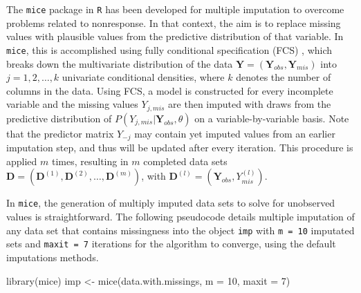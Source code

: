 \documentclass[psych,article,submit,moreauthors,pdftex]{mdpi}
\newenvironment{Shaded}{\begin{snugshade}}{\end{snugshade}}
\newcommand{\AttributeTok}[1]{\textcolor[rgb]{0.77,0.63,0.00}{#1}}
\newcommand{\DecValTok}[1]{\textcolor[rgb]{0.00,0.00,0.81}{#1}}
\newcommand{\FunctionTok}[1]{\textcolor[rgb]{0.00,0.00,0.00}{#1}}
\newcommand{\NormalTok}[1]{#1}
\newcommand{\OtherTok}[1]{\textcolor[rgb]{0.56,0.35,0.01}{#1}}
\begin{document}
The \texttt{mice} package \citep{mice} in \texttt{R} \citep{Rproject}
has been developed for multiple imputation to overcome problems related
to nonresponse. In that context, the aim is to replace missing values
with plausible values from the predictive distribution of that variable.
In \texttt{mice}, this is accomplished using fully conditional
specification (FCS) \citep{vanbuuren_fully_2006}, which breaks down the
multivariate distribution of the data
\(\textbf{Y} = (\textbf{Y}_{obs}, \textbf{Y}_{mis})\) into
\(j = 1, 2, \dots, k\) univariate conditional densities, where \(k\)
denotes the number of columns in the data. Using FCS, a model is
constructed for every incomplete variable and the missing values
\(Y_{j, mis}\) are then imputed with draws from the predictive
distribution of \(P(Y_{j, mis} | \textbf{Y}_{obs}, \theta)\) on a
variable-by-variable basis. Note that the predictor matrix \(Y_{-j}\)
may contain yet imputed values from an earlier imputation step, and thus
will be updated after every iteration. This procedure is applied \(m\)
times, resulting in \(m\) completed data sets
\(\textbf{D} = (\textbf{D}^{(1)}, \textbf{D}^{(2)}, \dots, \textbf{D}^{(m)})\),
with \(\textbf{D}^{(l)} = (\textbf{Y}_{obs}, Y^{(l)}_{mis})\).

In \texttt{mice}, the generation of multiply imputed data sets to solve
for unobserved values is straightforward. The following pseudocode
details multiple imputation of any data set that contains missingness
into the object \texttt{imp} with \texttt{m\ =\ 10} imputated sets and
\texttt{maxit\ =\ 7} iterations for the algorithm to converge, using the
default imputations methods.

\begin{Shaded}
\begin{Highlighting}[]
\FunctionTok{library}\NormalTok{(mice)}
\NormalTok{imp }\OtherTok{\textless{}{-}} \FunctionTok{mice}\NormalTok{(data.with.missings, }
            \AttributeTok{m =} \DecValTok{10}\NormalTok{,}
            \AttributeTok{maxit =} \DecValTok{7}\NormalTok{)}
\end{Highlighting}
\end{Shaded}
\end{document}
